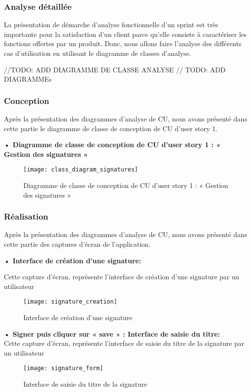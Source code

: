 \subsubsection{Analyse détaillée}
La présentation de démarche d'analyse fonctionnelle d'un sprint est très importante pour la satisfaction d'un client parce qu'elle consiste à caractériser les fonctions offertes par un produit.
Donc, nous allons faire l'analyse des différents cas d'utilisation en utilisant le diagramme de classes d'analyse.

//TODO: ADD DIAGRAMME DE CLASSE ANALYSE
// TODO: ADD DIAGRAMMEs

\subsubsection{Conception}

Après la présentation des diagrammes d'analyse de CU, nous avons présenté dans cette partie le diagramme de classe de conception de CU d'user story 1.

\textbf{•	Diagramme de classe de conception de CU d'user story 1 : « Gestion des signatures »}

\begin{figure}[h]
  \centering
  \texttt{[image: class\_diagram\_signatures]}
  \caption{Diagramme de classe de conception de CU d'user story 1 : « Gestion des signatures »}
  \label{fig:UseCaseDiagramSignatures}
\end{figure}

\subsubsection{Réalisation}

Après la présentation des diagrammes d'analyse de CU, nous avons présenté dans cette partie des captures d'écran de l'application.

\textbf{•	Interface de création d'une signature:}

Cette capture d'écran, représente l'interface de création d'une signature par un utilisateur

\begin{figure}[h]
  \centering
  \texttt{[image: signature\_creation]}
  \caption{Interface de création d'une signature}
  \label{fig:signature_creation}
\end{figure}

\textbf{•	Signer puis cliquer sur « save » : Interface de saisie du titre:}\\
Cette capture d'écran, représente l'interface de saisie du titre de la signature par un utilisateur
\newpage
\begin{figure}[h!]
  \centering
  \texttt{[image: signature\_form]}
  \caption{Interface de saisie du titre de la signature}
  \label{fig:signature_title}
\end{figure}

